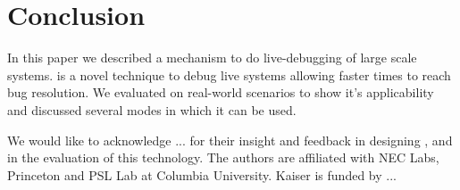 \section{Conclusion}
\label{sec:conclusion}

In this paper we described \parikshan a mechanism to do live-debugging of large scale systems.
\parikshan is a novel technique to debug live systems allowing faster times to reach bug resolution.
We evaluated \parikshan on real-world scenarios to show it's applicability and discussed several modes in which it can be used.

We would like to acknowledge ... for their insight and feedback in designing \parikshan, and in the evaluation of this technology.
The authors are affiliated with NEC Labs, Princeton and PSL Lab at Columbia University. 
Kaiser is funded by ...
